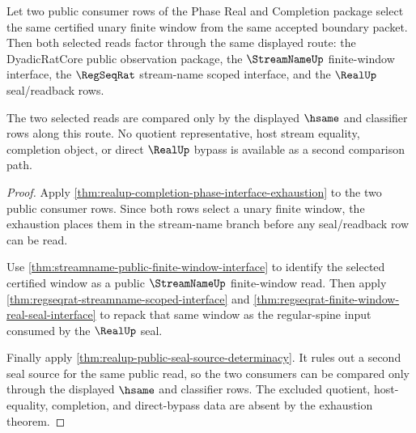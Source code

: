 \begin{theorem}
\label{thm:realup-completion-phase-selected-window-determinacy}
Let two public consumer rows of the Phase Real and Completion package select
the same certified unary finite window from the same accepted boundary packet.
Then both selected reads factor through the same displayed route: the
DyadicRatCore public observation package, the $\StreamNameUp$ finite-window
interface, the $\RegSeqRat$ stream-name scoped interface, and the $\RealUp$
seal/readback rows.

The two selected reads are compared only by the displayed $\hsame$ and
classifier rows along this route. No quotient representative, host stream
equality, completion object, or direct $\RealUp$ bypass is available as a
second comparison path.
\end{theorem}
\begin{proof}
Apply
\autoref{thm:realup-completion-phase-interface-exhaustion} to the two public
consumer rows. Since both rows select a unary finite window, the exhaustion
places them in the stream-name branch before any seal/readback row can be
read.

Use \autoref{thm:streamname-public-finite-window-interface} to identify the
selected certified window as a public $\StreamNameUp$ finite-window read. Then
apply \autoref{thm:regseqrat-streamname-scoped-interface} and
\autoref{thm:regseqrat-finite-window-real-seal-interface} to repack that same
window as the regular-spine input consumed by the $\RealUp$ seal.

Finally apply \autoref{thm:realup-public-seal-source-determinacy}. It rules
out a second seal source for the same public read, so the two consumers can be
compared only through the displayed $\hsame$ and classifier rows. The excluded
quotient, host-equality, completion, and direct-bypass data are absent by the
exhaustion theorem.
\end{proof}
